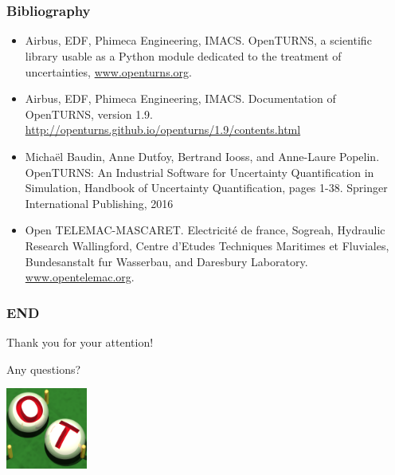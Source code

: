 \documentclass{beamer}
\begin{document}
% 
% 
% 
% 
% 
% 

\section{}

\begin{frame}
\frametitle{Bibliography}

\begin{itemize}
\item Airbus, EDF, Phimeca Engineering, IMACS. 
OpenTURNS, a scientific library usable as a Python module dedicated to the treatment of uncertainties, 
\url{www.openturns.org}.
\item Airbus, EDF, Phimeca Engineering, IMACS. Documentation of OpenTURNS, version 1.9. 
\url{http://openturns.github.io/openturns/1.9/contents.html}
\item  Michaël Baudin, Anne Dutfoy, Bertrand Iooss, and Anne-Laure Popelin. 
OpenTURNS: An Industrial Software for Uncertainty Quantification in Simulation, 
Handbook of Uncertainty Quantification, 
pages 1-38. Springer International Publishing, 2016
\item Open TELEMAC-MASCARET. 
Electricité de france, Sogreah, Hydraulic Research Wallingford, 
Centre d'Etudes Techniques Maritimes et Fluviales, Bundesanstalt fur Wasserbau, and Daresbury Laboratory.
\url{www.opentelemac.org}.
\end{itemize}

\end{frame}



\begin{frame}
\frametitle{END}

Thank you for your attention!

Any questions?

\begin{center}
\includegraphics[width=0.2\textwidth]{figures/logo-ot-small}
\end{center}

\end{frame}
\end{document}
